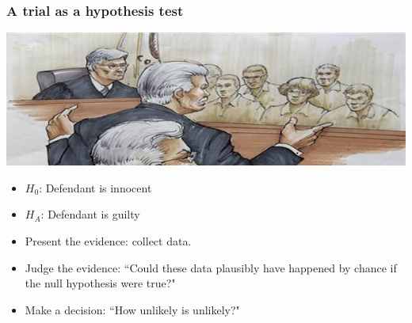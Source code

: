 \documentclass[slidestop,compress,mathserif,12pt,t,professionalfonts,xcolor=table]{beamer}
\begin{document}

\begin{frame}
\frametitle{A trial as a hypothesis test}

\begin{center}
\includegraphics[width=\textwidth]{figures/trial}
\end{center}

\begin{itemize}

\item $H_0$: Defendant is innocent 

\item $H_A$: Defendant is guilty

\item Present the evidence: collect data.

\item Judge the evidence: ``Could these data plausibly have happened by chance if the null hypothesis were true?"

\item Make a decision: ``How unlikely is unlikely?"

\end{itemize}

\end{frame}

\end{document}

